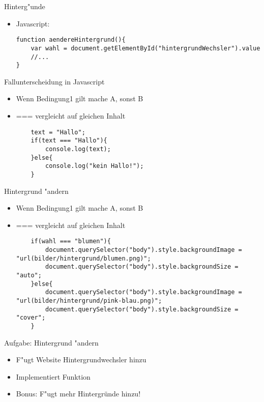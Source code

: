 \documentclass[18pt]{beamer}
\begin{document}
\begin{frame}[fragile]{Hinterg"unde}
\begin{itemize}
	\item Javascript:
	\begin{lstlisting}
function aendereHintergrund(){
	var wahl = document.getElementById("hintergrundWechsler").value
	//...
}
	\end{lstlisting}
	
\end{itemize}
\end{frame}

\begin{frame}[fragile]{Fallunterscheidung in Javascript}
\begin{itemize}
	\item \glqq Wenn Bedingung1 gilt mache A, sonst B\grqq
	\item === vergleicht auf gleichen Inhalt
	\begin{lstlisting}
	text = "Hallo";
	if(text === "Hallo"){
		console.log(text);
	}else{
		console.log("kein Hallo!");
	}
	\end{lstlisting}
\end{itemize}
\end{frame}

\begin{frame}[fragile]{Hintergrund "andern }
\begin{itemize}
	\item \glqq Wenn Bedingung1 gilt mache A, sonst B\grqq
	\item === vergleicht auf gleichen Inhalt
	\begin{lstlisting}
	if(wahl === "blumen"){
		document.querySelector("body").style.backgroundImage = "url(bilder/hintergrund/blumen.png)";
		document.querySelector("body").style.backgroundSize = "auto";
	}else{
		document.querySelector("body").style.backgroundImage = "url(bilder/hintergrund/pink-blau.png)";
		document.querySelector("body").style.backgroundSize = "cover";
	}
	\end{lstlisting}
\end{itemize}
\end{frame}


\begin{frame}[fragile]{Aufgabe: Hintergrund "andern }
\begin{itemize}
	\item F"ugt Website Hintergrundwechsler hinzu
	\item Implementiert Funktion
	\item Bonus: F"ugt mehr Hintergründe hinzu!
\end{itemize}
\end{frame}
\end{document}
